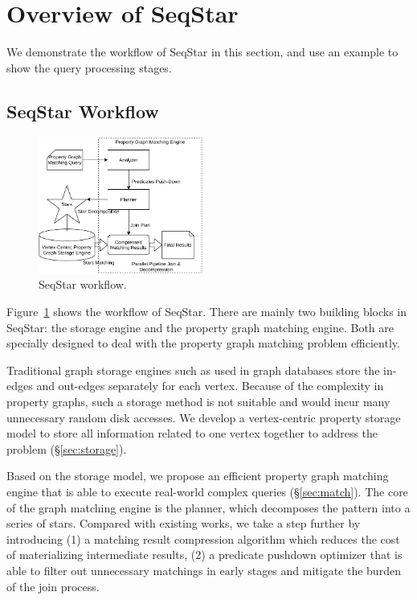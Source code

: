 \section{Overview of SeqStar}\label{sec:framework}
We demonstrate the workflow of SeqStar in this section,
and use an example to show the query processing stages.
\subsection{SeqStar Workflow}
\begin{figure}[ht]
  \centering
  \includegraphics[width=0.48\textwidth]{img/architecture.pdf}
  \caption{SeqStar workflow.}\label{img:architecture}
\end{figure}
Figure~\ref{img:architecture} shows the workflow of SeqStar. There are mainly two building blocks in SeqStar: the storage engine and the property graph matching engine.
Both are specially designed to deal with the property graph matching problem efficiently.

Traditional graph storage engines such as used in graph databases store the in-edges and out-edges separately for each vertex.
Because of the complexity in property graphs,
such a storage method is not suitable and would incur many unnecessary random disk accesses.
We develop a vertex-centric property storage model to store all information related to one vertex together to address the problem (\S\ref{sec:storage}).


Based on the storage model,
we propose an efficient property graph matching engine that is able to execute real-world complex queries (\S\ref{sec:match}).
The core of the graph matching engine is the planner, which  decomposes the pattern into a series of stars.
Compared with existing works, we take a step further by introducing
(1) a matching result compression algorithm which reduces the cost of materializing intermediate results,
(2) a predicate pushdown optimizer that is able to filter out unnecessary matchings in early stages and mitigate the burden of the join process.
